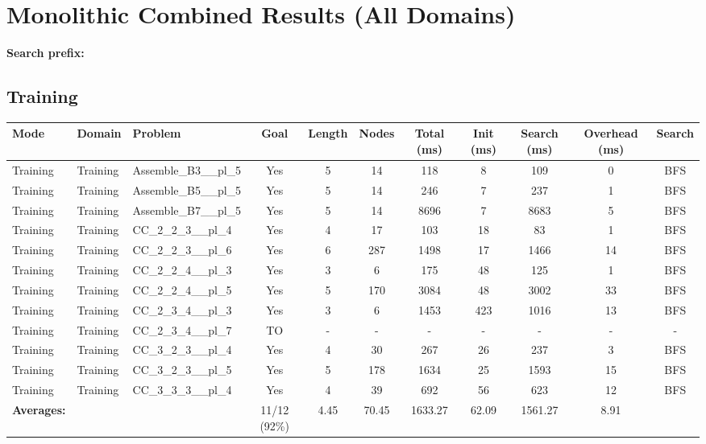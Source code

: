 \documentclass{article}
\begin{document}
\section*{Monolithic Combined Results (All Domains)}
\textbf{Search prefix:} 
\\[0.5cm]
\subsection*{Training}
\begin{tabular}{lllcccccccc}
\toprule
Mode & Domain & Problem & Goal & Length & Nodes & Total (ms) & Init (ms) & Search (ms) & Overhead (ms) & Search \\
\midrule
Training & Training & Assemble\_B3\_\_pl\_5 & Yes & 5 & 14 & 118 & 8 & 109 & 0 & BFS \\
Training & Training & Assemble\_B5\_\_pl\_5 & Yes & 5 & 14 & 246 & 7 & 237 & 1 & BFS \\
Training & Training & Assemble\_B7\_\_pl\_5 & Yes & 5 & 14 & 8696 & 7 & 8683 & 5 & BFS \\
Training & Training & CC\_2\_2\_3\_\_pl\_4 & Yes & 4 & 17 & 103 & 18 & 83 & 1 & BFS \\
Training & Training & CC\_2\_2\_3\_\_pl\_6 & Yes & 6 & 287 & 1498 & 17 & 1466 & 14 & BFS \\
Training & Training & CC\_2\_2\_4\_\_pl\_3 & Yes & 3 & 6 & 175 & 48 & 125 & 1 & BFS \\
Training & Training & CC\_2\_2\_4\_\_pl\_5 & Yes & 5 & 170 & 3084 & 48 & 3002 & 33 & BFS \\
Training & Training & CC\_2\_3\_4\_\_pl\_3 & Yes & 3 & 6 & 1453 & 423 & 1016 & 13 & BFS \\
Training & Training & CC\_2\_3\_4\_\_pl\_7 & TO & - & - & - & - & - & - & - \\
Training & Training & CC\_3\_2\_3\_\_pl\_4 & Yes & 4 & 30 & 267 & 26 & 237 & 3 & BFS \\
Training & Training & CC\_3\_2\_3\_\_pl\_5 & Yes & 5 & 178 & 1634 & 25 & 1593 & 15 & BFS \\
Training & Training & CC\_3\_3\_3\_\_pl\_4 & Yes & 4 & 39 & 692 & 56 & 623 & 12 & BFS \\
\textbf{Averages:} & & & 11/12 (92\%) & 4.45 & 70.45 & 1633.27 & 62.09 & 1561.27 & 8.91 & \\
\bottomrule
\end{tabular}
\newpage
\end{document}
